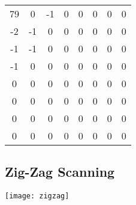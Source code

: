 \begin{center}
	\begin{tabular}{ c c c c c c c c }
		79 & 0  & -1 & 0 & 0 & 0 & 0 & 0 \\
		-2 & -1 & 0  & 0 & 0 & 0 & 0 & 0 \\
		-1 & -1 & 0  & 0 & 0 & 0 & 0 & 0 \\
		-1 & 0  & 0  & 0 & 0 & 0 & 0 & 0 \\
		0  & 0  & 0  & 0 & 0 & 0 & 0 & 0 \\
		0  & 0  & 0  & 0 & 0 & 0 & 0 & 0 \\
		0  & 0  & 0  & 0 & 0 & 0 & 0 & 0 \\
		0  & 0  & 0  & 0 & 0 & 0 & 0 & 0
	\end{tabular}
\end{center}
\subsection{Zig-Zag Scanning}
\begin{center}
	\texttt{[image: zigzag]}
\end{center}


